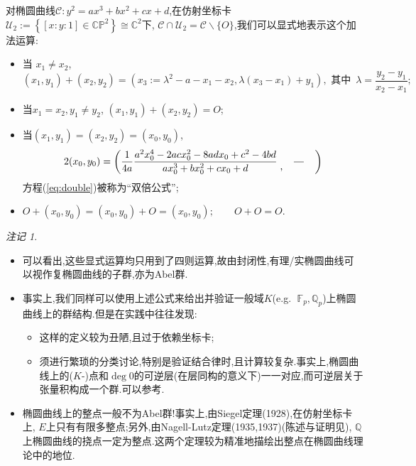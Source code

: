 \documentclass[12pt,A4paper,oneside,reqno]{amsart}
\numberwithin{equation}{section}
\theoremstyle{definition}
\theoremstyle{plain}
\theoremstyle{plain}
\numberwithin{equation}{section}
\theoremstyle{remark}
\newtheorem{remarks}[theorem]{注记}
\begin{document}
对椭圆曲线$\mathcal{C}:y^2=ax^3+bx^2+cx+d$,在仿射坐标卡$\mathcal{U}_2:=\left\{[x:y:1] \in \mathbb{CP}^2\right\} \cong \mathbb{C}^2$下, $\mathcal{C} \cap \mathcal{U}_2=\mathcal{C} \smallsetminus \{O\}$,我们可以显式地表示这个加法运算:
\begin{itemize}
	\item 当 $x_1 \neq x_2$, $$(x_1,y_1)+(x_2,y_2)=\left(x_3:=\lambda^2-a-x_1-x_2, \lambda (x_3-x_1)+y_1 \right), \text{ 其中 } \,\lambda=\frac{y_2-y_1}{x_2-x_1};$$
	\item  当$x_1 = x_2, y_1 \neq y_2$, $(x_1,y_1)+(x_2,y_2)=O$;
	\item 当$(x_1,y_1)=(x_2,y_2)=(x_0,y_0)$,
	\begin{equation}\label{eq:double}
		2(x_0,y_0)=\left(\frac{1}{4a}\frac{a^2x_0^4-2acx_0^2-8adx_0+c^2-4bd}{ax_0^3+bx_0^2+cx_0+d} \;\raisebox{-5pt}{,}\quad\frac{\phantom{66}}{\phantom{66}}\quad\right)
	\end{equation}
	方程(\ref{eq:double})被称为“双倍公式”;
	\item $O+(x_0,y_0)=(x_0,y_0)+O=(x_0,y_0); \qquad O+O=O$.
\end{itemize}
\begin{remarks}\
	\begin{itemize}
		\item 可以看出,这些显式运算均只用到了四则运算,故由封闭性,有理/实椭圆曲线可以视作复椭圆曲线的子群,亦为Abel群.
		\item 事实上,我们同样可以使用上述公式来给出并验证一般域$K$(e.g. $\;\mathbb{F}_p,\mathbb{Q}_p$)上椭圆曲线上的群结构.但是在实践中往往发现:
		\begin{itemize}
			\item 这样的定义较为丑陋,且过于依赖坐标卡;
			\item 须进行繁琐的分类讨论,特别是验证结合律时,且计算较复杂.事实上,椭圆曲线上的($K$-)点和$\deg 0$的可逆层(在层同构的意义下)一一对应,而可逆层关于张量积构成一个群.可以参考\cite[Proposition 19.9.3]{vakil2017rising}.
		\end{itemize}
		\item 椭圆曲线上的整点一般不为Abel群!事实上,由Siegel定理(1928),在仿射坐标卡上, $E$上只有有限多整点;另外,由Nagell-Lutz定理(1935,1937)(陈述与证明见\cite[p56, Theorem 2.5]{silverman1992rational}), $\mathbb{Q}$上椭圆曲线的挠点一定为整点.这两个定理较为精准地描绘出整点在椭圆曲线理论中的地位.
	\end{itemize}
\end{remarks}
\end{document}
